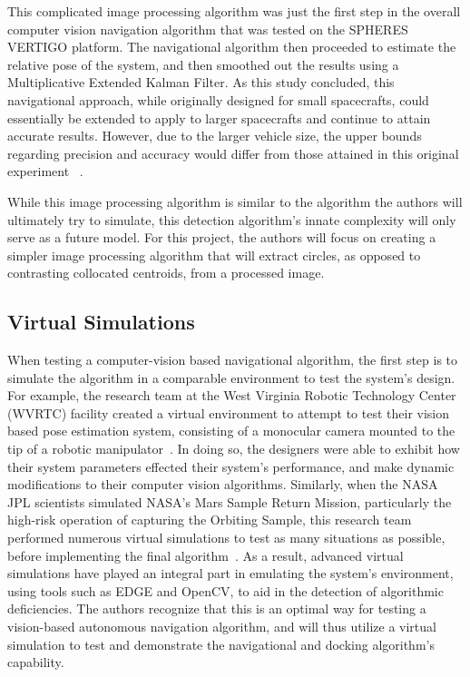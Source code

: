 \documentclass[journal, 10pt]{IEEEtran}
\begin{document}
This complicated image processing algorithm was just the first step in the overall computer vision navigation algorithm that was tested on the SPHERES VERTIGO platform. The navigational algorithm then proceeded to estimate the relative pose of the system, and then smoothed out the results using a Multiplicative Extended Kalman Filter. As this study concluded, this navigational approach, while originally designed for small spacecrafts, could essentially be extended to apply to larger spacecrafts and continue to attain accurate results. However, due to the larger vehicle size, the upper bounds regarding precision and accuracy would differ from those attained in this original experiment ~\cite{Vision, Thesis}. 

While this image processing algorithm is similar to the algorithm the authors will ultimately try to simulate, this detection algorithm's innate complexity will only serve as a future model. For this project, the authors will focus on creating a simpler image processing algorithm that will extract circles, as opposed to contrasting collocated centroids, from a processed image. 

\subsection{Virtual Simulations}

When testing a computer-vision based navigational algorithm, the first step is to simulate the algorithm in a comparable environment to test the system's design. For example, the research team at the West Virginia Robotic Technology Center (WVRTC) facility created a virtual environment to attempt to test their vision based pose estimation system, consisting of a monocular camera mounted to the tip of a robotic manipulator~\cite{virt_sim}. In doing so, the designers were able to exhibit how their system parameters effected their system's performance, and make dynamic modifications to their computer vision algorithms. Similarly, when the NASA JPL scientists simulated NASA's Mars Sample Return Mission, particularly the high-risk operation of capturing the Orbiting Sample, this research team performed numerous virtual simulations to test as many situations as possible, before implementing the final algorithm~\cite{mars}. As a result, advanced virtual simulations have played an integral part in emulating the system's environment, using tools such as EDGE and OpenCV, to aid in the detection of algorithmic deficiencies. The authors recognize that this is an optimal way for testing a vision-based autonomous navigation algorithm, and will thus utilize a virtual simulation to test and demonstrate the navigational and docking algorithm's capability.
\end{document}

